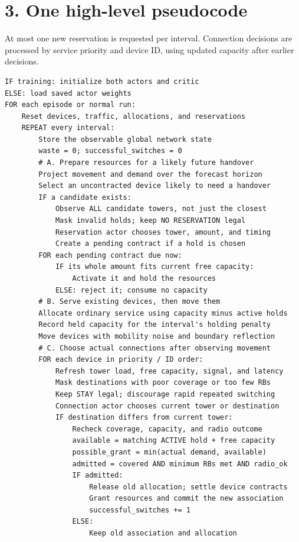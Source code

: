\documentclass[10pt,a4paper]{article}
\begin{document}
\section*{3. One high-level pseudocode}
At most one new reservation is requested per interval. Connection decisions are processed by service priority and device ID, using updated capacity after earlier decisions.
\begin{lstlisting}
IF training: initialize both actors and critic
ELSE: load saved actor weights
FOR each episode or normal run:
    Reset devices, traffic, allocations, and reservations
    REPEAT every interval:
        Store the observable global network state
        waste = 0; successful_switches = 0
        # A. Prepare resources for a likely future handover
        Project movement and demand over the forecast horizon
        Select an uncontracted device likely to need a handover
        IF a candidate exists:
            Observe ALL candidate towers, not just the closest
            Mask invalid holds; keep NO RESERVATION legal
            Reservation actor chooses tower, amount, and timing
            Create a pending contract if a hold is chosen
        FOR each pending contract due now:
            IF its whole amount fits current free capacity:
                Activate it and hold the resources
            ELSE: reject it; consume no capacity
        # B. Serve existing devices, then move them
        Allocate ordinary service using capacity minus active holds
        Record held capacity for the interval's holding penalty
        Move devices with mobility noise and boundary reflection
        # C. Choose actual connections after observing movement
        FOR each device in priority / ID order:
            Refresh tower load, free capacity, signal, and latency
            Mask destinations with poor coverage or too few RBs
            Keep STAY legal; discourage rapid repeated switching
            Connection actor chooses current tower or destination
            IF destination differs from current tower:
                Recheck coverage, capacity, and radio outcome
                available = matching ACTIVE hold + free capacity
                possible_grant = min(actual demand, available)
                admitted = covered AND minimum RBs met AND radio_ok
                IF admitted:
                    Release old allocation; settle device contracts
                    Grant resources and commit the new association
                    successful_switches += 1
                ELSE:
                    Keep old association and allocation

\end{lstlisting}
\end{document}
